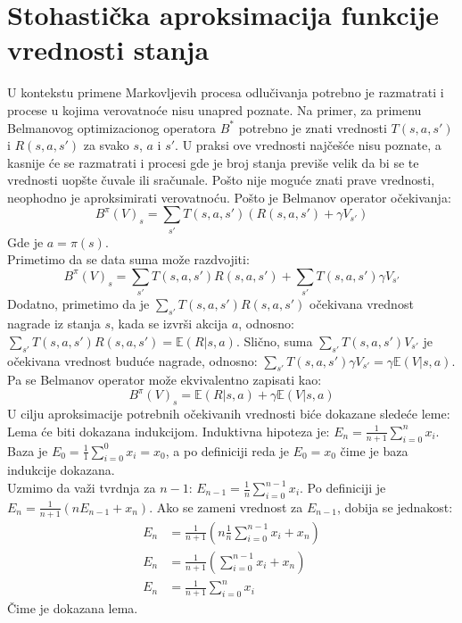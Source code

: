\documentclass[a4paper,fleqn,12pt]{JMThesis}
\theoremstyle{plain}
\theoremstyle{definition}
\theoremstyle{definition}
\begin{document}
\section{Stohastička aproksimacija funkcije vrednosti stanja}
U kontekstu primene Markovljevih procesa odlučivanja potrebno je razmatrati i procese u kojima verovatnoće nisu unapred poznate.
Na primer, za primenu Belmanovog optimizacionog operatora $B^*$ potrebno je znati vrednosti $T(s,a,s')$ i $R(s,a,s')$ za svako $s$, $a$ i $s'$.
U praksi ove vrednosti najčešće nisu poznate, a kasnije će se razmatrati i procesi gde je broj stanja previše velik da bi se te vrednosti
uopšte čuvale ili sračunale. Pošto nije moguće znati prave vrednosti, neophodno je aproksimirati verovatnoću.
Pošto je Belmanov operator očekivanja:
\[ 	B^{\pi}(V)_s = \sum_{s'}T(s,a,s')(R(s,a,s') + \gamma V_{s'}) \]
Gde je $a = \pi(s)$.\\
Primetimo da se data suma može razdvojiti:
\[ 	B^{\pi}(V)_s = \sum_{s'}T(s,a,s')R(s,a,s') + \sum_{s'}T(s,a,s')\gamma V_{s'}\]
Dodatno, primetimo da je $\sum_{s'}T(s,a,s')R(s,a,s')$ očekivana vrednost nagrade iz stanja $s$, kada se izvrši akcija $a$, odnosno:
$\sum_{s'}T(s,a,s')R(s,a,s') = \mathbb{E}(R | s,a)$.
Slično, suma $\sum_{s'}T(s,a,s') V_{s'}$ je očekivana vrednost buduće nagrade, odnosno:
$\sum_{s'}T(s,a,s')\gamma V_{s'} = \gamma \mathbb{E}(V | s, a)$. Pa se Belmanov operator može ekvivalentno zapisati kao:
\[ 	B^{\pi}(V)_s = \mathbb{E}(R | s,a) + \gamma \mathbb{E}(V | s, a) \]
U cilju aproksimacije potrebnih očekivanih vrednosti biće dokazane sledeće leme:
\\
Lema će biti dokazana indukcijom. Induktivna hipoteza je: $E_n = \frac{1}{n+1}\sum_{i=0}^n x_i$.
Baza je $E_0 = \frac{1}{1}\sum_{i=0}^0 x_i = x_0$, a po definiciji reda je $E_0 = x_0$ čime je baza indukcije dokazana.\\
Uzmimo da važi tvrdnja za $n-1$: $E_{n-1} = \frac{1}{n}\sum_{i=0}^{n-1} x_i$.
Po definiciji je $E_n = \frac{1}{n+1}(n E_{n-1} + x_n)$. Ako se zameni vrednost za $E_{n-1}$, dobija se jednakost:
\[
	\begin{split}
		E_n &= \frac{1}{n+1}(n \frac{1}{n}\sum_{i=0}^{n-1}x_i + x_n)\\
		E_n &= \frac{1}{n+1}(\sum_{i=0}^{n-1}x_i + x_n)\\
		E_n &= \frac{1}{n+1}\sum_{i=0}^{n}x_i
	\end{split}
\]
Čime je dokazana lema.
\end{document}
